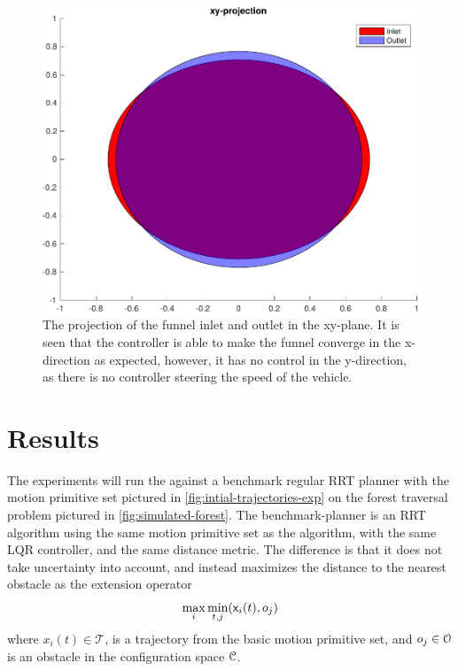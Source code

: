 \begin{figure}
  \centering
  \includegraphics[width=.8\textwidth]{figures/experiments/funnel-inlet-outlet}
  \caption{The projection of the funnel inlet and outlet in the xy-plane. It is
    seen that the controller is able to make the funnel converge in the
    x-direction as expected, however, it has no control in the y-direction, as
    there is no controller steering the speed of the vehicle.}
  \label{fig:funnel-inlet-outlet}
\end{figure}

\section{Results}
\label{sec:experiments-final}

The experiments will run the \rrtfunnel{} against a benchmark regular RRT
planner with the motion primitive set pictured in
\cref{fig:intial-trajectories-exp} on the forest traversal problem pictured in
\cref{fig:simulated-forest}. The benchmark-planner is an \ac{RRT} algorithm
using the same motion primitive set as the \rrtfunnel{} algorithm, with the same
\ac{LQR} controller, and the same distance metric. The difference is that it
does not take uncertainty into account, and instead maximizes the distance to
the nearest obstacle as the extension operator \ie{}
\begin{equation}
  \max_{i}\min_{t,j}({\mathbf{\mathsf{x}}}_{i}(t), o_{j})
\end{equation}
where \(x_{i}(t) \in \mathcal{T}\), is a trajectory from the basic motion
primitive set, and \(o_{j} \in \mathcal{O}{}\) is an obstacle in the
configuration space \(\mathcal{C}{}\).

